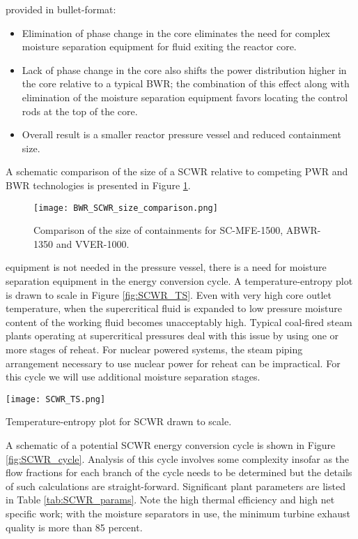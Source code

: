  provided in bullet-format:
\begin{itemize}
\item Elimination of phase change in the core eliminates the need for complex moisture separation equipment for fluid exiting the reactor core.  
\item Lack of phase change in the core also shifts the power distribution higher in the core relative to a typical BWR; the combination of this effect along with elimination of the moisture separation equipment favors locating the control rods at the top of the core.
\item Overall result is a smaller reactor pressure vessel and reduced containment size.
\end{itemize}
A schematic comparison of the size of a SCWR relative to competing PWR and BWR technologies is presented in Figure \ref{fig:SCWR_size}.
\begin{figure}
\texttt{[image: BWR\_SCWR\_size\_comparison.png]}
\caption{Comparison of the size of containments for SC-MFE-1500, ABWR-1350 and VVER-1000.}
\label{fig:SCWR_size}
\end{figure}

 equipment is not needed in the pressure vessel, there is a need for moisture separation equipment in the energy conversion cycle.  A temperature-entropy plot is drawn to scale in Figure \ref{fig:SCWR_TS}.  Even with very high core outlet temperature, when the supercritical fluid is expanded to low pressure moisture content of the working fluid becomes unacceptably high. Typical coal-fired steam plants operating at supercritical pressures deal with this issue by using one or more stages of reheat.  For nuclear powered systems, the steam piping arrangement necessary to use nuclear power for reheat can be impractical. For this cycle we will use additional moisture separation stages. 
\begin{marginfigure}
\texttt{[image: SCWR\_TS.png]}
\caption{Temperature-entropy plot for SCWR drawn to scale.}
\label{fig:SCWR_TS}
\end{marginfigure}
A schematic of a potential SCWR energy conversion cycle is shown in Figure \ref{fig:SCWR_cycle}. Analysis of this cycle involves some complexity insofar as the flow fractions for each branch of the cycle needs to be determined but the details of such calculations are straight-forward.  Significant plant parameters are listed in Table \ref{tab:SCWR_params}.  Note the high thermal efficiency and high net specific work; with the moisture separators in use, the minimum turbine exhaust quality is more than 85 percent.  

